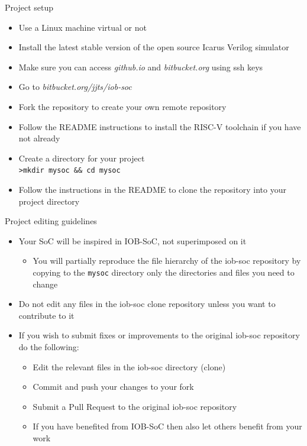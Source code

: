 \documentclass [xcolor=svgnames, t] {beamer}
\begin{document}
\begin{frame}{Project setup}
\begin{center}
  \begin{itemize}
    \item Use a Linux machine virtual or not
    \item Install the latest stable version of the open source Icarus Verilog simulator
    \item Make sure you can access {\it github.io} and {\it bitbucket.org} using ssh keys
    \item Go to {\it bitbucket.org/jjts/iob-soc}
    \item Fork the repository to create your own remote repository
    \item Follow the README instructions to install the RISC-V toolchain if you have not already
    \item Create a directory for your project\\
      {\tt >mkdir mysoc \&\& cd mysoc}
    \item Follow the instructions in the README to clone the repository into your project directory
  \end{itemize}
\end{center}
\end{frame}


\begin{frame}{Project editing guidelines}
\begin{itemize}
\item Your SoC will be inspired in IOB-SoC, not superimposed on it
  \begin{itemize}
  \item You will partially reproduce the file hierarchy of the iob-soc
    repository by copying to the {\tt mysoc} directory only the directories and
    files you need to change
  \end{itemize}
\item Do not edit any files in the iob-soc clone repository unless you want to contribute to it
\item If you wish to submit fixes or improvements to the original iob-soc repository do the following:
  \begin{itemize}
  \item Edit the relevant files in the iob-soc directory (clone)
  \item Commit and push your changes to your fork
  \item Submit a Pull Request to the original iob-soc repository
  \item If you have benefited from IOB-SoC then also let others benefit from your work
  \end{itemize}
\end{itemize}
\end{frame}
\end{document}

